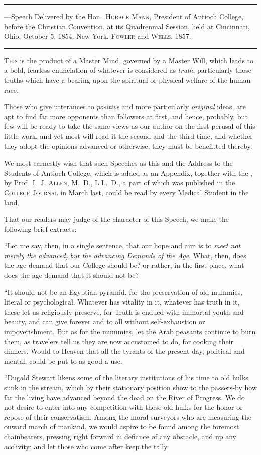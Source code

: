 
\fancybreak{* * *}
\footnotesize
{}---Speech Delivered by the Hon.~\textsc{Horace Mann}, President of
Antioch College, before the Christian Convention, at its Quadrennial Session, held at
Cincinnati, Ohio, October 5, 1854. New York. \textsc{Fowler} and \textsc{Wells}, 1857.
\plainbreak{1}
\normalsize

\lettrine[lines=1]{}{This} is the product of a Master Mind, governed by a Master Will,
which leads to a bold, fearless enunciation of whatever is considered as
\emph{truth}, particularly those truths which have a bearing upon the spiritual
or physical welfare of the human race.

Those who give utterances to \emph{positive} and more particularly \emph{original}
ideas, are apt to find far more opponents than followers at first, and
hence, probably, but few will be ready to take the same views as our
author on the first perusal of this little work, and yet most will read it
the second and the third time, and whether they adopt the opinions
advanced or otherwise, they must be benefitted thereby.

We most earnestly wish that such Speeches as this and the Address
to the Students of Antioch College, which is added as an Appendix,
together with the , by Prof.~I.~J. \textsc{Allen}, M.~D., L.L.~D., a part of which was
published in the \textsc{College Journal} in March last, could be read by every
Medical Student in the land.

That our readers may judge of the character of this Speech, we
make the following brief extracts:

``Let me say, then, in a single sentence, that our hope and aim is to
\emph{meet not merely the advanced, but the advancing Demands of the Age}.
What, then, does the age demand that our College should be? or rather,
in the first place, what does the age demand that it should not be?

``It should not be an Egyptian pyramid, for the preservation of old
mummies, literal or psychological. Whatever has vitality in it, whatever
has truth in it, these let us religiously preserve, for Truth is endued
with immortal youth and beauty, and can give forever and to all without
self-exhaustion or impoverishment. But as for the mummies, let
the Arab peasants continue to burn them, as travelers tell us they are
now accustomed to do, for cooking their dinners. Would to Heaven
that all the tyrants of the present day, political and mental, could be
put to as good a use.

``Dugald Stewart likens some of the literary institutions of his time
to old hulks sunk in the stream, which by their stationary position
show to the passers-by how far the living have advanced beyond the
dead on the River of Progress. We do not desire to enter into any
competition with those old hulks for the honor or repose of their conservatism.
Among the moral surveyors who are measuring the onward
march of mankind, we would aspire to be found among the foremost
chainbearers, pressing right forward in defiance of any obstacle, and
up any acclivity; and let those who come after keep the tally.\endinput
